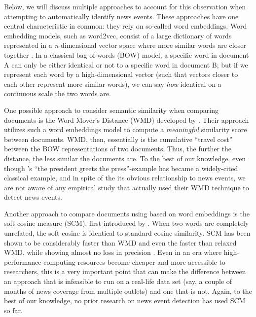 \documentclass[a4paper,man,natbib,floatsintext,mask]{apa6}
\begin{document}
Below, we will discuss multiple approaches to account for this observation when attempting to automatically identify news events. These approaches have one central characteristic in common: they rely on so-called word embeddings.
Word embedding models, such as word2vec, consist of a large dictionary of words represented in a \textit{n}-dimensional vector space where more similar words are closer together \citep[for more information on word embeddings, see][]{mikolov2013distributed}. In a classical bag-of-words (BOW) model, a specific word in document A can only be either identical or not to a specific word in document B; but if we represent each word by a high-dimensional vector (such that vectors closer to each other represent more similar words), we can say \emph{how} identical on a continuous scale the two words are.  

One possible approach to consider semantic similarity when comparing documents is the Word Mover's Distance (WMD) developed by \cite{Kusner2015}. Their approach utilizes such a word embeddings model to compute a \emph{meaningful} similarity score between documents. WMD, then, essentially is the cumulative ``travel cost'' between the BOW representations of two documents. Thus, the further the distance, the less similar the documents are. 
To the best of our knowledge, even though  \citeauthor{Kusner2015}'s ``the president greets the press''-example has became a widely-cited classical example, and in spite of the its obvious relationship to news events, we are not aware of any empirical study that actually used their WMD technique to detect news events.

Another approach to compare documents using based on word embeddings is the soft cosine measure (SCM), first introduced by \cite{sidorov2014soft}. When two words are completely unrelated, the soft cosine is identical to standard cosine similarity.
SCM has been shown to be considerably faster than WMD and even the faster than relaxed WMD, while showing almost no loss in precision \citep{Novotny2018}. Even in an era where high-performance computing resources become cheaper and more accessible to researchers, this is a very important point that can make the difference between an approach that is infeasible to run on a real-life data set (say, a couple of months of news coverage from multiple outlets) and one that is not. Again, to the best of our knowledge, no prior research on news event detection has used SCM so far. 
\end{document}
